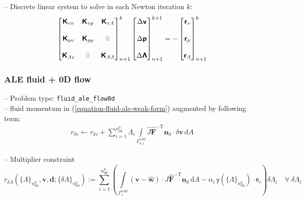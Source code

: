 \documentclass[a4paper,12pt]{report}
\newcommand{\fF}{\text{f}}
\newcommand{\bs}[1]{\boldsymbol{#1}}
\newcommand{\Gm}{\mathit{\Gamma}}
\newcommand{\zerom}{\textcolor{lightgray}{\bs{\mathsf{0}}}}
\newcommand{\ROP}{\bs{\mathsf{r}}}
\newcommand{\LMZ}{\bs{\mathsf{\Lambda}}}
\newcommand{\lmzi}{\mathit{\Lambda}} %
\begin{document}
-- Discrete linear system to solve in each Newton iteration $k$:
\begin{equation}
\label{equation-lin-sys-fluid-0d}
\begin{aligned}
\begin{bmatrix} \boldsymbol{\mathsf{K}}_{vv} & \boldsymbol{\mathsf{K}}_{vp} & \boldsymbol{\mathsf{K}}_{v\lmzi} \\ \\ \boldsymbol{\mathsf{K}}_{pv} & \boldsymbol{\mathsf{K}}_{pp} & \zerom \\ \\  \boldsymbol{\mathsf{K}}_{\lmzi v} & \zerom & \boldsymbol{\mathsf{K}}_{\lmzi\lmzi}\end{bmatrix}_{n+1}^{k}\begin{bmatrix} \Delta\boldsymbol{\mathsf{v}} \\ \\ \Delta\boldsymbol{\mathsf{p}} \\ \\ \Delta\LMZ \end{bmatrix}_{n+1}^{k+1}=-\begin{bmatrix} \ROP_{v} \\ \\ \ROP_{p} \\ \\ \ROP_{\lmzi}\end{bmatrix}_{n+1}^{k}
\end{aligned}
\end{equation}

\subsubsection{ALE fluid + 0D flow}\label{ale-fluid-0d-flow}
-- Problem type: \verb"fluid_ale_flow0d"\\

-- fluid momentum in (\ref{equation-fluid-ale-weak-form}) augmented by following term:
\begin{equation}
\begin{aligned}
r_{\delta v} \leftarrow r_{\delta v} + \sum\limits_{i=1}^{{n}_{\text{0d}}^{\text{b}}}\mathit{\Lambda}_{i}\int\limits_{\Gm_{0,i}^{\fF\text{-}\mathrm{0d}}}\widehat{J}\widehat{\boldsymbol{F}}^{-\mathrm{T}}\boldsymbol{n}_{0}\cdot\delta\boldsymbol{v}\,\mathrm{d}A
\end{aligned}
\end{equation}

-- Multiplier constraint
\begin{equation}
r_{\delta\mathit{\Lambda}}\left(\{\mathit{\Lambda}\}_{n_{\text{0d}}^{\text{b}}},\boldsymbol{v},\boldsymbol{d};\{\delta\mathit{\Lambda}\}_{n_{\text{0d}}^{\text{b}}}\right) := \sum\limits_{i=1}^{n_{\text{0d}}^{\text{b}}}\left(\int\limits_{\mathit{\Gamma}_{i}^{\text{f-0d}}} (\boldsymbol{v}-\widehat{\boldsymbol{w}})\cdot\widehat{J}\widehat{\boldsymbol{F}}^{-\mathrm{T}}\boldsymbol{n}_{0}\,\mathrm{d}A - \alpha_{i} \,\boldsymbol{\mathsf{y}}\left(\{\mathit{\Lambda}\}_{n_{\text{0d}}^{\text{b}}}\right)\cdot\boldsymbol{\mathsf{e}}_{i}\right)\delta\mathit{\Lambda}_{i} \quad \forall \; \delta\mathit{\Lambda}_i
\end{equation}
\end{document}
